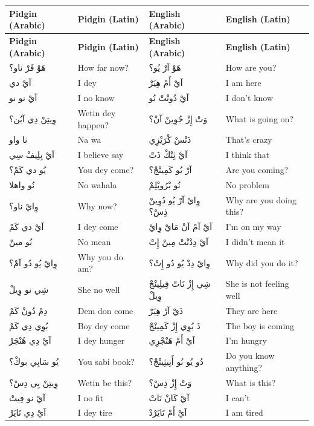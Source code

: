 \documentclass[12pt]{article}
\begin{document}
\begin{longtable}{p{3.2cm} p{3.2cm} p{3.2cm} p{3.2cm}}
\textbf{Pidgin (Arabic)} & \textbf{Pidgin (Latin)} & \textbf{English (Arabic)} & \textbf{English (Latin)} \\ \hline
\endfirsthead
\textbf{Pidgin (Arabic)} & \textbf{Pidgin (Latin)} & \textbf{English (Arabic)} & \textbf{English (Latin)} \\ \hline
\endhead

هَوْ فَرْ ناو؟ & How far now? & هَوْ آرْ يُو؟ & How are you? \\
آيْ دي & I dey & آيْ أَمْ هِيَرْ & I am here \\
آيْ نو نو & I no know & آيْ دُونْتْ نُو & I don't know \\
وِيتِنْ دِي آبُن؟ & Wetin dey happen? & وَتْ إِزْ جُوِينْ آنْ؟ & What is going on? \\
نا واو & Na wa & ذَتْسْ كْرَيْزِي & That’s crazy \\
آيْ بِلِيفْ سِي & I believe say & آيْ ثِنْكْ ذَتْ & I think that \\
يُو دي كَمْ؟ & You dey come? & آرْ يُو كَمِينْجْ؟ & Are you coming? \\
نُو واهلا & No wahala & نُو بْرُوبْلِمْ & No problem \\
وِايْ ناو؟ & Why now? & وِايْ آرْ يُو دُوِينْ ذِسْ؟ & Why are you doing this? \\
آيْ دي كَمْ & I dey come & آيْ آمْ آنْ مَايْ وِايْ & I’m on my way \\
نُو مينْ & No mean & آيْ دِدْنْتْ مِينْ إِتْ & I didn’t mean it \\
وِايْ يُو دُو آمْ؟ & Why you do am? & وِايْ دِدْ يُو دُو إِتْ؟ & Why did you do it? \\
شِي نو وِيلْ & She no well & شِي إِزْ نَاتْ فِيلِينْجْ وِيلْ & She is not feeling well \\
دِمْ دُونْ كَمْ & Dem don come & ذَيْ آرْ هِيَرْ & They are here \\
بُوِي دِي كَمْ & Boy dey come & ذَ بُوِي إِزْ كَمِينْجْ & The boy is coming \\
آيْ دِي هُنْجَرْ & I dey hunger & آيْ أَمْ هَنْجْرِي & I’m hungry \\
يُو سَابِي بوكْ؟ & You sabi book? & دُو يُو نُو أَنِيثِينْجْ؟ & Do you know anything? \\
وِيتِنْ بِي دِسْ؟ & Wetin be this? & وَتْ إِزْ ذِسْ؟ & What is this? \\
آيْ نو فِيتْ & I no fit & آيْ كَانْ نَاتْ & I can’t \\
آيْ دِي تَايَرْ & I dey tire & آيْ أَمْ تَايَرْدْ & I am tired \\


\end{longtable}
\end{document}
